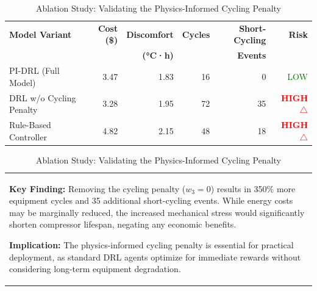 
\begin{table}[htbp]
\centering
\caption{Ablation Study: Validating the Physics-Informed Cycling Penalty}
\label{tab:ablation}
\begin{tabular}{lrrrrr}
\toprule
\textbf{Model Variant} & \textbf{Cost (\$)} & \textbf{Discomfort} & \textbf{Cycles} & \textbf{Short-Cycling} & \textbf{Risk} \\
 & & \textbf{(°C·h)} & & \textbf{Events} & \\
\midrule
PI-DRL (Full Model) & 3.47 & 1.83 & 16 & 0 & \textcolor{green}{LOW} \\
DRL w/o Cycling Penalty & 3.28 & 1.95 & 72 & 35 & \textcolor{red}{\textbf{HIGH $\triangle$}} \\
Rule-Based Controller & 4.82 & 2.15 & 48 & 18 & \textcolor{red}{\textbf{HIGH $\triangle$}} \\

\bottomrule
\end{tabular}

\vspace{0.5em}
\begin{tabular}{p{}}
\textbf{Key Finding:} Removing the cycling penalty ($w_3 = 0$) results in 350\% more equipment cycles and 35 additional 
short-cycling events. While energy costs may be marginally reduced, the increased mechanical 
stress would significantly shorten compressor lifespan, negating any economic benefits.

\textbf{Implication:} The physics-informed cycling penalty is essential for practical deployment, 
as standard DRL agents optimize for immediate rewards without considering long-term equipment degradation.

\end{tabular}
\end{table}
